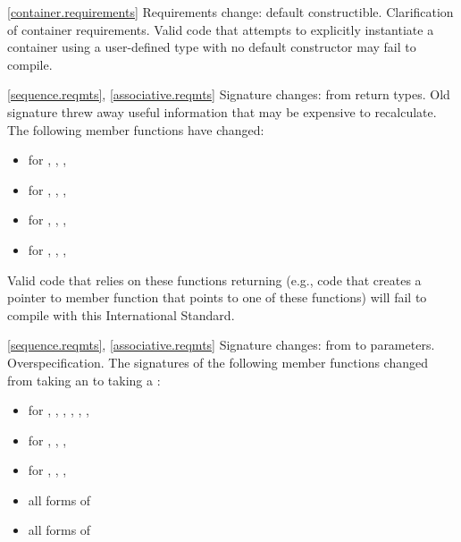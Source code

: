 \ref{container.requirements}
\change Requirements change: default constructible.
\rationale Clarification of container requirements.
\effect
Valid \CppIII code that attempts to explicitly instantiate a container using
a user-defined type with no default constructor may fail to compile.

\ref{sequence.reqmts}, \ref{associative.reqmts}
\change Signature changes: from  return types.
\rationale Old signature threw away useful information that may be expensive
to recalculate.
\effect
The following member functions have changed:
\begin{itemize}
\item {} for , , , 
\item {} for , , , 
\item {} for , , , 
\item {} for , , , 
\end{itemize}

Valid \CppIII code that relies on these functions returning 
(e.g., code that creates a pointer to member function that points to one
of these functions) will fail to compile with this International Standard.

\ref{sequence.reqmts}, \ref{associative.reqmts}
\change Signature changes: from  to 
parameters.
\rationale Overspecification.
\effect
The signatures of the following member functions changed from taking an
 to taking a :

\begin{itemize}
\item {} for , , ,
, , , 
\item {} for , , ,
\item {} for , , , 
\item all forms of 
\item all forms of 
\end{itemize}

